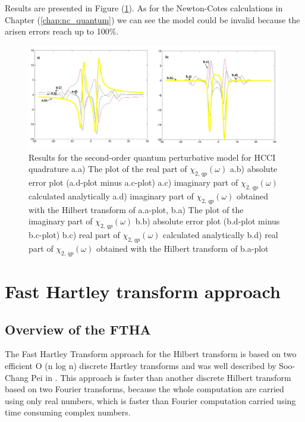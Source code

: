 \documentclass[12pt,twoside,a4paper]{article}
\numberwithin{equation}{subsection}
\numberwithin{figure}{subsection}
\begin{document}
Results are presented in Figure (\ref{fig:hcc_qp2}). As for the Newton-Cotes calculations in Chapter (\ref{chap:nc_quantum}) we can
see the model could be invalid because the arisen errors reach up to 100\%. 

\begin{figure} 
  \includegraphics[width=150mm]{img/hcc_qp2.png}
  \caption{Results for the second-order quantum perturbative model for HCCI quadrature
     a.a) The plot of the real part of $\chi_{2, \, qp} (\omega )$
     a.b) absolute error plot (a.d-plot minus a.c-plot) 
     a.c) imaginary part of $\chi_{2, \, qp} (\omega )$ calculated analytically 
     a.d) imaginary part of $\chi_{2, \, qp} (\omega )$ obtained with the Hilbert transform of a.a-plot, 
     b.a) The plot of the imaginary part of ${\chi_{2, \,qp}}(\omega )$ 
     b.b) absolute error plot (b.d-plot minus b.c-plot) 
     b.c) real part of $\chi_{2, \, qp} (\omega )$ calculated analytically 
     b.d) real part of $\chi_{2, \, qp} (\omega )$ obtained with the Hilbert transform of b.a-plot 
     \label{fig:hcc_qp2}
     }
\end{figure}


\section{Fast Hartley transform approach} \label{chap:hartley}

\subsection{Overview of the FTHA} \label{chap:hartley_overview}

The Fast Hartley Transform approach for the Hilbert transform is based on two efficient O (n log n) discrete Hartley transforms and
was well described by Soo-Chang Pei in \cite{chang_computation}. This approach is faster than another discrete Hilbert transform
based on two Fourier transforms, because the whole computation are carried using only real numbers, which is faster than Fourier
computation carried using time consuming complex numbers.
\end{document}

